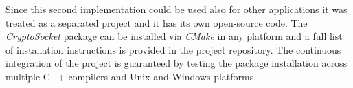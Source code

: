\documentclass{standalone}
\begin{document}
Since this second implementation could be used also for other applications it was treated as a separated project and it has its own open-source code.
The \emph{CryptoSocket} package can be installed via \emph{CMake} in any platform and a full list of installation instructions is provided in the project repository.
The continuous integration of the project is guaranteed by testing the package installation across multiple C++ compilers and Unix and Windows platforms.
\end{document}
